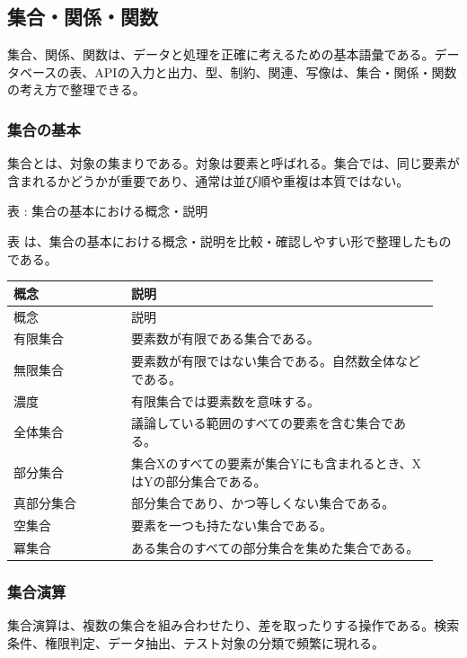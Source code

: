 \subsection{集合・関係・関数}
集合、関係、関数は、データと処理を正確に考えるための基本語彙である。データベースの表、APIの入力と出力、型、制約、関連、写像は、集合・関係・関数の考え方で整理できる。

\subsubsection{集合の基本}
集合とは、対象の集まりである。対象は要素と呼ばれる。集合では、同じ要素が含まれるかどうかが重要であり、通常は並び順や重複は本質ではない。

\par\smallskip\noindent{}\label{tab:ch17-06}表 \thetable: 集合の基本における概念・説明\par\smallskip
表 \thetable は、集合の基本における概念・説明を比較・確認しやすい形で整理したものである。\par\smallskip
\begin{longtable}{>{\raggedright\arraybackslash}p{0.26\linewidth} >{\raggedright\arraybackslash}p{0.68\linewidth}}
\toprule
概念 & 説明 \\
\midrule
\endfirsthead
\toprule
概念 & 説明 \\
\midrule
\endhead
有限集合 & 要素数が有限である集合である。 \\
無限集合 & 要素数が有限ではない集合である。自然数全体などである。 \\
濃度 & 有限集合では要素数を意味する。 \\
全体集合 & 議論している範囲のすべての要素を含む集合である。 \\
部分集合 & 集合Xのすべての要素が集合Yにも含まれるとき、XはYの部分集合である。 \\
真部分集合 & 部分集合であり、かつ等しくない集合である。 \\
空集合 & 要素を一つも持たない集合である。 \\
冪集合 & ある集合のすべての部分集合を集めた集合である。 \\
\bottomrule
\end{longtable}
\subsubsection{集合演算}
集合演算は、複数の集合を組み合わせたり、差を取ったりする操作である。検索条件、権限判定、データ抽出、テスト対象の分類で頻繁に現れる。

